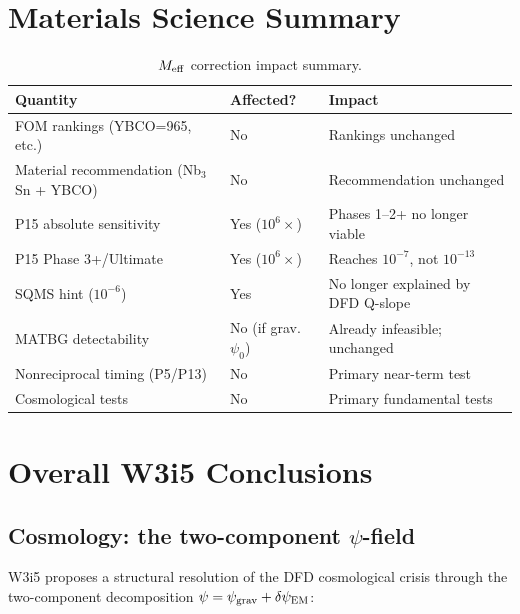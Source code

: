 \documentclass[11pt]{article}
\begin{document}
\section{Materials Science Summary}
\label{sec:matsci-summary}

\begin{table}[h!]
\centering
\caption{$M_{\rm eff}$ correction impact summary.}
\label{tab:Meff-summary}
\begin{tabular}{p{4cm}p{3cm}p{5cm}}
\toprule
\textbf{Quantity} & \textbf{Affected?} & \textbf{Impact} \\
\midrule
FOM rankings (YBCO=965, etc.) & No & Rankings unchanged \\
Material recommendation (Nb$_3$Sn + YBCO) & No & Recommendation unchanged \\
P15 absolute sensitivity & Yes ($10^6\times$) & Phases 1--2+ no longer viable \\
P15 Phase 3+/Ultimate & Yes ($10^6\times$) & Reaches $10^{-7}$, not $10^{-13}$ \\
SQMS hint ($10^{-6}$) & Yes & No longer explained by DFD Q-slope \\
MATBG detectability & No (if grav.\ $\psi_0$) & Already infeasible; unchanged \\
Nonreciprocal timing (P5/P13) & No & Primary near-term test \\
Cosmological tests & No & Primary fundamental tests \\
\bottomrule
\end{tabular}
\end{table}

\section{Overall W3i5 Conclusions}
\label{sec:conclusions}

\subsection{Cosmology: the two-component $\psi$-field}

W3i5 proposes a structural resolution of the DFD cosmological crisis
through the two-component decomposition $\psi = \psi_{\rm grav} + \delta\psi_{\rm EM}$:
\end{document}

